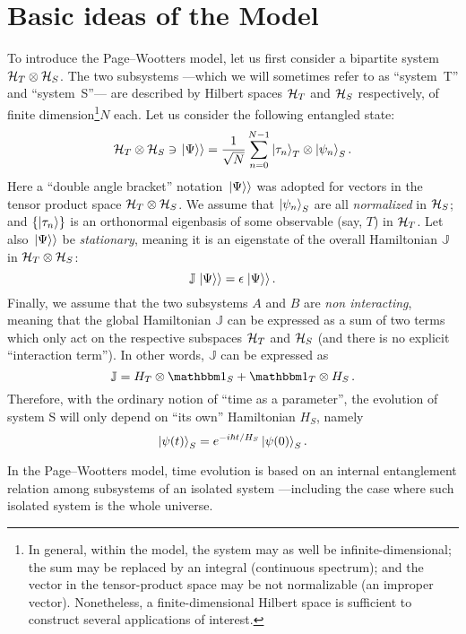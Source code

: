\section{Basic ideas of the Model}

To introduce the Page--Wootters model, let us first consider
a bipartite system $\mathcal{H}_T \otimes \mathcal{H}_S$.
The two subsystems
---which we will sometimes refer to as ``system~T'' and ``system~S''---
are described by Hilbert spaces
$\mathcal{H}_T$ and $\mathcal{H}_S$ respectively,
of finite dimension\footnote{
  In general, within the model,
  the system may as well be infinite-dimensional;
  the sum may be replaced by an integral (continuous spectrum);
  and the vector in the tensor-product space may be not normalizable (an improper vector).
  Nonetheless, a finite-dimensional Hilbert space is sufficient to construct several applications of interest.
}$N$ each.
Let us consider the following entangled state:
\begin{equation}\label{eq:pw:finite-entanglement}
  \mathcal{H}_T \otimes \mathcal{H}_S \ni \left.\left| \Psi \right\rangle\right\rangle
  =
  \frac{1}{\sqrt{N}} \sum_{n=0}^{N-1} \ket{\tau_{n}}_{T} \otimes \ket{\psi_{n}}_{S} \text{.}
\end{equation}
Here
a ``double angle bracket'' notation $\left.\left| \Psi \right\rangle\right\rangle$ was adopted
for vectors in the tensor product space $\mathcal{H}_T \otimes \mathcal{H}_S$.
We assume that $\ket{\psi_{n}}_{S}$ are all \emph{normalized} in $\mathcal{H}_S$;
and
$\qty{\ket{{\tau}_n}}$ is an orthonormal eigenbasis of some observable (say, $T$) in $\mathcal{H}_T$.
Let also $\left.\left| \Psi \right\rangle\right\rangle$ be \emph{stationary}, meaning it is an eigenstate
of the overall Hamiltonian $\mathbb{J}$ in $\mathcal{H}_T \otimes \mathcal{H}_S$:
$$
  \mathbb{J} \left.\left| \Psi \right\rangle\right\rangle = \epsilon \left.\left| \Psi \right\rangle\right\rangle \text{.}
$$
Finally, we assume that the two subsystems $A$ and $B$ are \emph{non interacting},
meaning that the global Hamiltonian $\mathbb{J}$ can be expressed as a sum of two terms
which only act on the respective subspaces $\mathcal{H}_T$ and $\mathcal{H}_S$
(and there is no explicit ``interaction term''). In other words,
$\mathbb{J}$ can be expressed as
$$
  \mathbb{J} = H_T \ox \idop_S + \idop_T \ox H_S \, \text{.} 
$$
Therefore, with the ordinary notion of ``time as a parameter'',
the evolution of system S will only depend on ``its own'' Hamiltonian $H_S$, namely
\begin{equation}\label{eq:pw:ordinary_S}
  \ket{\psi(t)}_S = e^{- i \hbar t / H_S } \ket{\psi(0)}_S \text{.}  
\end{equation}
 
In the Page--Wootters model, time evolution is based on an internal entanglement
relation among subsystems of an isolated system
---including the case where such isolated system is the whole universe.

